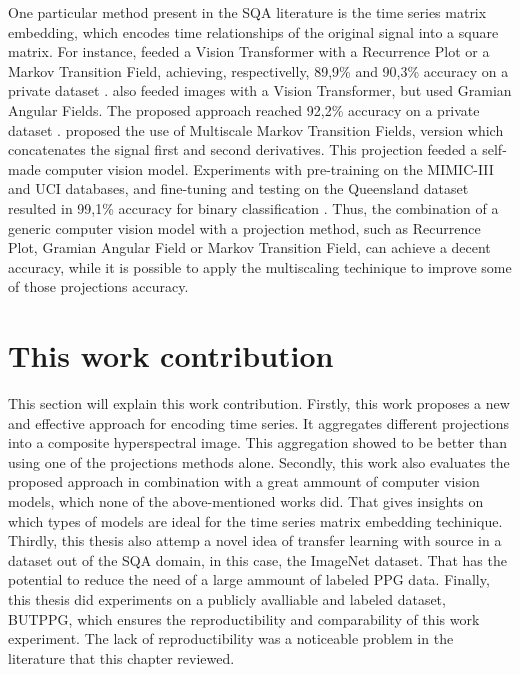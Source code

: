 One particular method present in the \gls{SQA} literature is the time series matrix embedding, which encodes time relationships of the original signal into a square matrix. For instance, \citeauthor{review-16} feeded a Vision Transformer with a Recurrence Plot or a Markov Transition Field, achieving, respectivelly, 89,9\% and 90,3\% accuracy on a private dataset \cite{review-16}. \citeauthor{review-17} also feeded images with a Vision Transformer, but used Gramian Angular Fields. The proposed approach reached 92,2\% accuracy on a private dataset \cite{review-17}. \citeauthor{review-18} proposed the use of Multiscale Markov Transition Fields, version which concatenates the signal first and second derivatives. This projection feeded a self-made computer vision model. Experiments with pre-training on the MIMIC-III and UCI databases, and fine-tuning and testing on the Queensland dataset resulted in 99,1\% accuracy for binary classification \cite{review-18}. Thus, the combination of a generic computer vision model with a projection method, such as Recurrence Plot, Gramian Angular Field or Markov Transition Field, can achieve a decent accuracy, while it is possible to apply the multiscaling techinique to improve some of those projections accuracy. 

\section{This work contribution}
\label{sec:my_work}

This section will explain this work contribution. Firstly, this work proposes a new and effective approach for encoding time series. It aggregates different projections into a composite hyperspectral image. This aggregation showed to be better than using one of the projections methods alone. Secondly, this work also evaluates the proposed approach in combination with a great ammount of computer vision models, which none of the above-mentioned works did. That gives insights on which types of models are ideal for the time series matrix embedding techinique. Thirdly, this thesis also attemp a novel idea of transfer learning with source in a dataset out of the \gls{SQA} domain, in this case, the ImageNet dataset. That has the potential to reduce the need of a large ammount of labeled \gls{PPG} data. Finally, this thesis did experiments on a publicly avalliable and labeled dataset, \gls{BUTPPG}, which ensures the reproductibility and comparability of this work experiment. The lack of reproductibility was a noticeable problem in the literature that this chapter reviewed.     
